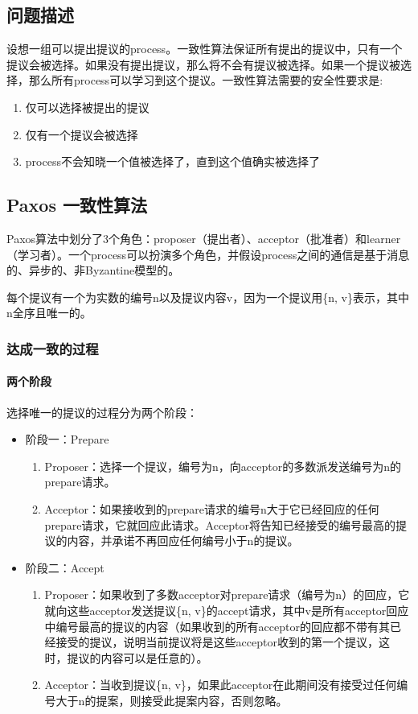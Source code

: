 \documentclass[UTF8]{article}
\begin{document}
\subsection{问题描述}

设想一组可以提出提议的process。一致性算法保证所有提出的提议中，只有一个提议会被选择。如果没有提出提议，那么将不会有提议被选择。如果一个提议被选择，那么所有process可以学习到这个提议。一致性算法需要的安全性要求是:
\begin{enumerate}
	\item 仅可以选择被提出的提议
	\item 仅有一个提议会被选择
	\item process不会知晓一个值被选择了，直到这个值确实被选择了
\end{enumerate}

\subsection{Paxos 一致性算法}

Paxos算法中划分了3个角色：proposer（提出者）、acceptor（批准者）和learner（学习者）。一个process可以扮演多个角色，并假设process之间的通信是基于消息的、异步的、非Byzantine模型的。

每个提议有一个为实数的编号n以及提议内容v，因为一个提议用\{n, v\}表示，其中n全序且唯一的。

\subsubsection{达成一致的过程}

\paragraph{两个阶段}
选择唯一的提议的过程分为两个阶段：

\begin{itemize}
	\item 阶段一：Prepare
		\begin{enumerate}
			\item Proposer：选择一个提议，编号为n，向acceptor的多数派发送编号为n的prepare请求。
			\item Acceptor：如果接收到的prepare请求的编号n大于它已经回应的任何prepare请求，它就回应此请求。Acceptor将告知已经接受的编号最高的提议的内容，并承诺不再回应任何编号小于n的提议。
		\end{enumerate}
	\item 阶段二：Accept
		\begin{enumerate}
			\item Proposer：如果收到了多数acceptor对prepare请求（编号为n）的回应，它就向这些acceptor发送提议\{n, v\}的accept请求，其中v是所有acceptor回应中编号最高的提议的内容（如果收到的所有acceptor的回应都不带有其已经接受的提议，说明当前提议将是这些acceptor收到的第一个提议，这时，提议的内容可以是任意的）。
			\item Acceptor：当收到提议\{n, v\}，如果此acceptor在此期间没有接受过任何编号大于n的提案，则接受此提案内容，否则忽略。
		\end{enumerate}
\end{itemize}
\end{document}
